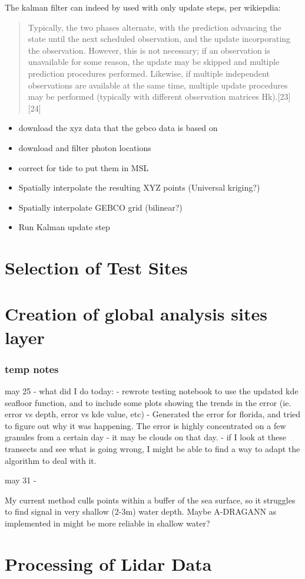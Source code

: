 The kalman filter can indeed by used with only update steps, per wikiepdia: 
\begin{quotation}
    Typically, the two phases alternate, with the prediction advancing the state until the next scheduled observation, and the update incorporating the observation. However, this is not necessary; if an observation is unavailable for some reason, the update may be skipped and multiple prediction procedures performed. Likewise, if multiple independent observations are available at the same time, multiple update procedures may be performed (typically with different observation matrices Hk).[23][24]
\end{quotation}
\begin{itemize}
    \color{orange}
    \item download the xyz data that the gebco data is based on
    \item download and filter photon locations
    \item correct for tide to put them in MSL
    \item Spatially interpolate the resulting XYZ points (Universal kriging?)
    \item Spatially interpolate GEBCO grid (bilinear?)
    \item Run Kalman update step  
\end{itemize}


\section{Selection of Test Sites}
\section{Creation of global analysis sites layer}
\subsubsection*{temp notes}

may 25 - what did I do today:
- rewrote testing notebook to use the updated kde seafloor function, and to include some plots showing the trends in the error (ie. error vs depth, error vs kde value, etc)
- Generated the error for florida, and tried to figure out why it was happening. The error is highly concentrated on a few granules from a certain day - it may be clouds on that day.
- if I look at these transects and see what is going wrong, I might be able to find a way to adapt the algorithm to deal with it.

may 31 -

My current method culls points within a buffer of the sea surface, so it struggles to find signal in very shallow (2-3m) water depth. Maybe A-DRAGANN as implemented in \cite{Cao2021} might be more reliable in shallow water?

\section{Processing of Lidar Data}

